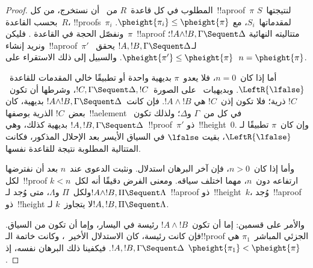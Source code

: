 \documentclass[../../../include/open-logic-section]{subfiles}
\begin{document}
\begin{proof}
المطلوب في كل قاعدة~$R$ من~ أن نستخرج، من كل~!!a{proof}~$\pi$
لنتيجتها~$S$ بحسب القاعدة~$R$، !!{proof}s~$\pi_i$ لمقدماتها~$S_i$، مع
$\pheight{\pi_i}\leq\pheight{\pi}$. ونفصّل الحجة في القاعدة
\LeftR{\land}. فليكن~$\pi$~!!a{proof} متتاليته النهائية
$!A\land !B,\Gamma\Sequent\Delta$؛ ونريد إنشاء~!!a{proof}~$\pi'$
لـ$!A,!B,\Gamma\Sequent\Delta$ يحقق~$\pheight{\pi'}\leq
\pheight{\pi}$. والسبيل إلى ذلك الاستقراء على~$n=\pheight{\pi}$.

أما إذا كان~$n=0$، فلا يعدو~$\pi$ بديهية واحدة أو تطبيقًا خالي المقدمات
للقاعدة~$\LeftR{\lfalse}$. وبديهيات~ على الصورة~$!C,\Gamma
\Sequent\Delta,!C$، وشرطها أن تكون~$!C$ ذرية؛ فلا تكون إذن~$!C$ هي
$!A\land !B$. فإن كانت~$!A\land !B,\Gamma\Sequent\Delta$ بديهية، كان
بعض~$!C$ الذرية بوصفها~!!a{element} في كل من~$\Gamma$ و$\Delta$؛ ولذلك
تكون~$!A,!B,\Gamma\Sequent\Delta$ بديهية كذلك، وهي~!!{proof}~$\pi'$
ذو~!!{height}~$0$. وإن كان~$\pi$ تطبيقًا لـ$\LeftR{\lfalse}$، بقيت
$\lfalse$ في السياق الأيسر بعد الإحلال المذكور، فكانت
المتتالية المطلوبة نتيجة للقاعدة نفسها.

وأما إذا كان~$n>0$، فإن آخر البرهان استدلال. ونثبت الدعوى عند~$n$ بعد أن
نفترضها لكل~!!{proof} ارتفاعه دون~$n$، مهما اختلف سياقه. ومعنى الفرض
دقيقًا أنه لكل~$k<n$ ولكل~$\Pi$ و$\Lambda$، متى وُجد لـ$!A\land
!B,\Pi\Sequent\Lambda$~!!a{proof} ذو~!!{height}~$k$، وُجد~!!a{proof}
ذو~!!{height} لا يتجاوز~$k$ لـ$!A,!B,\Pi\Sequent\Lambda$.

والأمر على قسمين: إما أن تكون~$!A\land !B$ رئيسة في اليسار، وإما أن
تكون من السياق. فإن كانت رئيسة، كان الاستدلال الأخير~\LeftR{\land}،
وكانت خاتمة الـ!!{proof} الجزئي المباشر~$\pi_1$ هي
$!A,!B,\Gamma\Sequent\Delta$. فيكفينا ذلك البرهان نفسه، إذ
$\pheight{\pi_1}<\pheight{\pi}$.


\end{proof}
\end{document}
